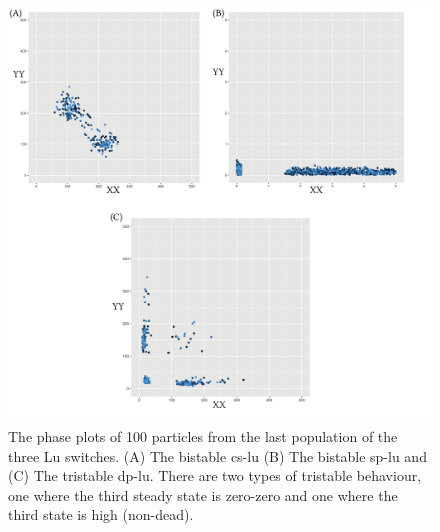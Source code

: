 \begin{figure}[p]
\begin{center}
\includegraphics[width=\textwidth]{../../chapters/chapterStabilityFinder/images/lu_paper_phase.png}
\caption[Resulting phase plots from StabilityFinder used on the Lu switches ]{ \label{fig:lu_paper_phase}The phase plots of 100 particles from the last population of the three Lu switches. (A) The bistable \acrshort{cs-lu} (B) The bistable \acrshort{sp-lu} and (C) The tristable \acrshort{dp-lu}. There are two types of tristable behaviour, one where the third steady state is zero-zero and one where the third state is high (non-dead). }
\end{center}
\end{figure}
\clearpage

